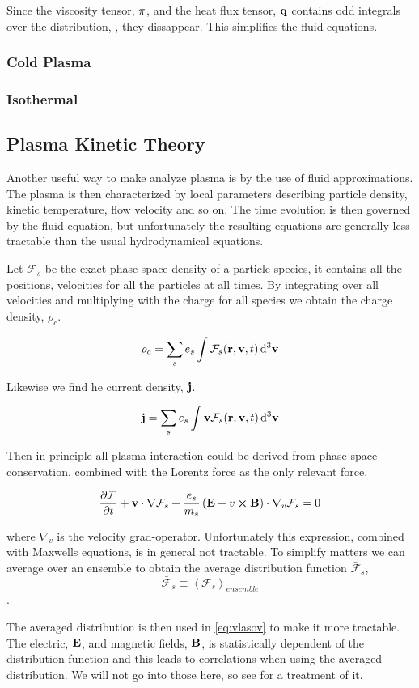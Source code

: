 	Since the viscosity tensor, \(\vb{\pi}\), and the heat flux tensor, \(\vb{q}\)
	contains odd integrals over the distribution, \textit{},
	they dissappear. This simplifies the fluid equations.


	\subsubsection{Cold Plasma}

	\subsubsection{Isothermal}

\subsection{Plasma Kinetic Theory}
	Another useful way to make analyze plasma is by the use of fluid approximations.
	The plasma is then characterized by local parameters describing particle
	density, kinetic temperature, flow velocity and so on. The time evolution
	is then governed by the fluid equation, but unfortunately the resulting
	equations are generally less tractable than the usual hydrodynamical
	equations.

	Let \(\mathcal{F}_s\) be the exact phase-space density of a particle species,
	it contains all the positions, velocities for all the particles at
	all times. By integrating over all velocities and multiplying with the charge
	for all species we obtain the charge density, \(\rho_c\).

	\[\rho_c = \sum_s e_s \int \mathcal{F}_s(\vb{r},\vb{v},t)\dd[3]{\vb{v}}\]

	Likewise we find he current density, \(\vb{j}\).

	\[\vb{j} = \sum_s e_s \int \vb{v}\mathcal{F}_s(\vb{r},\vb{v},t)\dd[3]{\vb{v}}\]

	Then in principle all plasma interaction could be derived from phase-space
	conservation, combined with the Lorentz force as the only relevant force,

	\begin{align}
		\pdv{\mathcal{F}}{t} + \vb{v}\cdot\nabla\mathcal{F}_s + \frac{e_s}{m_s}\left( \vb{E} + v\cross\vb{B} \right) \cdot \nabla_v\mathcal{F}_s = 0 \label{eq:vlasov}
	\end{align}

	where \(\nabla_v\) is the velocity grad-operator.
	Unfortunately this expression, combined with Maxwells equations, is in general
	not tractable. To simplify matters we can average over an ensemble to obtain the
	average distribution function \(\mathcal{\bar{F}}_s\),
	\[\mathcal{\bar{F}}_s \equiv \left< \mathcal{F}_s\right>_{ensemble}\].

	The averaged distribution is then used in \cref{eq:vlasov} to make it more tractable.
	The electric, \(\vb{E}\), and magnetic fields, \(\vb{B}\), is statistically
	dependent of the distribution function and this leads to correlations when
	using the averaged distribution. We will not go into those here, so see
	\textit{}\citep{fitzpatrick_plasma_2014}
	for a treatment of it.
